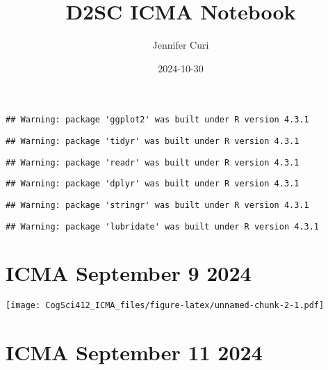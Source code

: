 \documentclass[
]{article}
\title{D2SC ICMA Notebook}
\author{Jennifer Curi}
\date{2024-10-30}
\newenvironment{Shaded}{\begin{snugshade}}{\end{snugshade}}
\newcommand{\AttributeTok}[1]{\textcolor[rgb]{0.13,0.29,0.53}{#1}}
\newcommand{\ConstantTok}[1]{\textcolor[rgb]{0.56,0.35,0.01}{#1}}
\newcommand{\FunctionTok}[1]{\textcolor[rgb]{0.13,0.29,0.53}{\textbf{#1}}}
\newcommand{\NormalTok}[1]{#1}
\newcommand{\SpecialCharTok}[1]{\textcolor[rgb]{0.81,0.36,0.00}{\textbf{#1}}}
\begin{document}
\maketitle

{
\setcounter{tocdepth}{2}
\tableofcontents
}
\begin{Shaded}
\end{Shaded}

\begin{verbatim}
## Warning: package 'ggplot2' was built under R version 4.3.1
\end{verbatim}

\begin{verbatim}
## Warning: package 'tidyr' was built under R version 4.3.1
\end{verbatim}

\begin{verbatim}
## Warning: package 'readr' was built under R version 4.3.1
\end{verbatim}

\begin{verbatim}
## Warning: package 'dplyr' was built under R version 4.3.1
\end{verbatim}

\begin{verbatim}
## Warning: package 'stringr' was built under R version 4.3.1
\end{verbatim}

\begin{verbatim}
## Warning: package 'lubridate' was built under R version 4.3.1
\end{verbatim}

\section{ICMA September 9 2024}\label{icma-september-9-2024}

\texttt{[image: CogSci412\_ICMA\_files/figure-latex/unnamed-chunk-2-1.pdf]}

\section{ICMA September 11 2024}\label{icma-september-11-2024}
\end{document}
